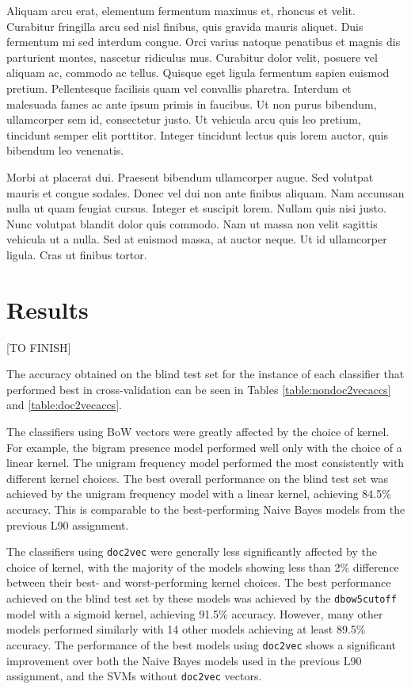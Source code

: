 \documentclass[twocolumn]{article}
\begin{document}
Aliquam arcu erat, elementum fermentum maximus et, rhoncus et velit. Curabitur fringilla arcu sed nisl finibus, quis gravida mauris aliquet. Duis fermentum mi sed interdum congue. Orci varius natoque penatibus et magnis dis parturient montes, nascetur ridiculus mus. Curabitur dolor velit, posuere vel aliquam ac, commodo ac tellus. Quisque eget ligula fermentum sapien euismod pretium. Pellentesque facilisis quam vel convallis pharetra. Interdum et malesuada fames ac ante ipsum primis in faucibus. Ut non purus bibendum, ullamcorper sem id, consectetur justo. Ut vehicula arcu quis leo pretium, tincidunt semper elit porttitor. Integer tincidunt lectus quis lorem auctor, quis bibendum leo venenatis.

Morbi at placerat dui. Praesent bibendum ullamcorper augue. Sed volutpat mauris et congue sodales. Donec vel dui non ante finibus aliquam. Nam accumsan nulla ut quam feugiat cursus. Integer et suscipit lorem. Nullam quis nisi justo. Nunc volutpat blandit dolor quis commodo. Nam ut massa non velit sagittis vehicula ut a nulla. Sed at euismod massa, at auctor neque. Ut id ullamcorper ligula. Cras ut finibus tortor.

\section{Results}

[TO FINISH]

The accuracy obtained on the blind test set for the instance of each classifier that performed best in cross-validation can be seen in Tables \ref{table:nondoc2vecaccs} and \ref{table:doc2vecaccs}.

The classifiers using BoW vectors were greatly affected by the choice of kernel. For example, the bigram presence model performed well only with the choice of a linear kernel. The unigram frequency model performed the most consistently with different kernel choices. The best overall performance on the blind test set was achieved by the unigram frequency model with a linear kernel, achieving 84.5\% accuracy. This is comparable to the best-performing Naive Bayes models from the previous L90 assignment.

The classifiers using \texttt{doc2vec} were generally less significantly affected by the choice of kernel, with the majority of the models showing less than 2\% difference between their best- and worst-performing kernel choices. The best performance achieved on the blind test set by these models was achieved by the \texttt{dbow5cutoff} model with a sigmoid kernel, achieving 91.5\% accuracy. However, many other models performed similarly with 14 other models achieving at least 89.5\% accuracy. The performance of the best models using \texttt{doc2vec} shows a significant improvement over both the Naive Bayes models used in the previous L90 assignment, and the SVMs without \texttt{doc2vec} vectors.
\end{document}
